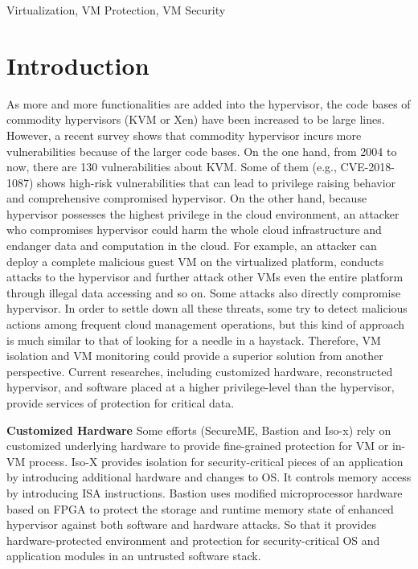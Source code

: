 \documentclass[conference]{IEEEtran}
\begin{document}
\begin{IEEEkeywords}
Virtualization, VM Protection, VM Security
\end{IEEEkeywords}

\section{Introduction}




As more and more functionalities are added into the hypervisor, the code bases of commodity hypervisors (KVM or Xen) have been increased to be large lines. However, a recent survey shows that commodity hypervisor incurs more vulnerabilities because of the larger code bases. 
On the one hand, from 2004 to now, there are 130 vulnerabilities about KVM.
Some of them (e.g., CVE-2018-1087)
shows high-risk vulnerabilities that can lead to privilege raising behavior and comprehensive compromised hypervisor.
On the other hand, because hypervisor possesses the highest privilege in the cloud environment, an attacker who compromises hypervisor could harm the whole cloud infrastructure and endanger data and computation in the cloud. For example, an attacker can deploy a complete malicious guest VM on the virtualized platform, conducts attacks to the hypervisor and further attack other VMs even the entire platform through illegal data accessing and so on. Some attacks also directly compromise hypervisor.
In order to settle down all these threats, some try to detect malicious actions among frequent cloud management operations, but this kind of approach is much similar to that of looking for a needle in a haystack. Therefore, VM isolation and VM monitoring could provide a superior solution from another perspective. 
Current researches, including customized hardware, reconstructed hypervisor, and software placed at a higher privilege-level than the hypervisor, provide services of protection for critical data.

\textbf{Customized Hardware }
Some efforts (SecureME\cite{Chhabra2011SecureME}, Bastion\cite{Champagne2010Scalable} and Iso-x\cite{Evtyushkin2015Iso}) rely on 
customized underlying hardware to provide fine-grained protection for VM or in-VM process. 
Iso-X provides isolation for security-critical pieces of an application by introducing additional hardware and changes to OS. It controls memory access by introducing ISA instructions. 
Bastion uses modified microprocessor hardware based on FPGA to protect the storage and runtime memory state of enhanced hypervisor against both software and hardware attacks. So that it provides hardware-protected environment and protection for security-critical OS and application modules in an untrusted software stack. 
\end{document}

